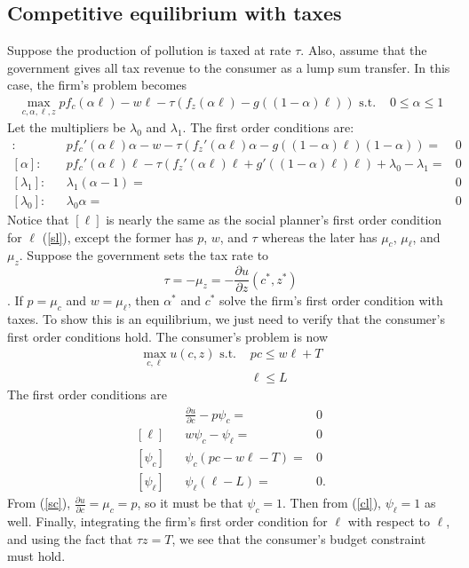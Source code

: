 \documentclass[12pt,reqno]{amsart}
\theoremstyle{definition}
\begin{document}
\subsection{Competitive equilibrium with taxes}

Suppose the production of pollution is taxed at rate $\tau$. Also,
assume that the government gives all tax revenue to the consumer as a
lump sum transfer. 
In this case, the firm's problem becomes
\begin{align*}
  \max_{c,\alpha,\ell,z} p f_c(\alpha \ell) - w \ell -
  \tau\left(f_z(\alpha \ell) - g((1-\alpha)\ell) \right) \text{ s.t. } & 0
  \leq \alpha \leq 1 
\end{align*}
Let the multipliers be $\lambda_0$ and $\lambda_1$. The first order
conditions are:  
\begin{align*} 
  [\ell]: & & p f_c'(\alpha \ell) \alpha - w - \tau \left( f_z'(\alpha
    \ell)\alpha - g((1-\alpha)\ell)(1-\alpha) \right) = &
  0   \\
  [\alpha]: & & p f_c'(\alpha \ell) \ell - \tau \left( f_z'(\alpha\ell)
    \ell + g'((1-\alpha)\ell) \ell \right) + \lambda_{0} - \lambda_{1} =
  & 0  \\ 
  [\lambda_{1}]: && \lambda_{1}(\alpha -1) = & 0 \\
  [\lambda_{0}]: && \lambda_{0}\alpha = & 0 
\end{align*}
Notice that $[\ell]$ is nearly the same as the social planner's
first order condition for $\ell$ (\ref{sl}), except the former has
$p$, $w$, and $\tau$ whereas the later has $\mu_c$, $\mu_\ell$, and
$\mu_z$. Suppose the government sets the tax rate to 
\[ \tau = -\mu_z = -
\frac{\partial u}{\partial z}(c^*,z^*) \].
If $p = \mu_c$ and $w=\mu_\ell$, then $\alpha^*$ and $c^*$ solve the firm's
first order condition with taxes. To show this is an equilibrium, we
just need to verify that the consumer's first order conditions hold.
The consumer's problem is now 
\begin{align*}
  \max_{c,\ell} u(c,z) \text{ s.t. } & pc \leq w \ell + T \\
  & \ell \leq L 
\end{align*}
The first order conditions are
\begin{align}
  [c]&& \frac{\partial u}{\partial c} - p \psi_c = & 0 \label{cc} \\
  [\ell]&&  w \psi_c - \psi_\ell = & 0 \label{cl} \\
  [\psi_c]&& \psi_c(pc-w\ell - T) = & 0 \\
  [\psi_\ell] && \psi_\ell(\ell-L) = & 0.
\end{align}
From (\ref{sc}), $\frac{\partial u}{\partial c} = \mu_c = p $, so it
must be that $\psi_c = 1$.  Then from (\ref{cl}), $\psi_\ell = 1$ as
well. Finally, integrating the firm's first order condition for $\ell$
with respect to $\ell$, and using the fact that $\tau z = T$, we see
that the consumer's budget constraint must hold. 
\end{document}
